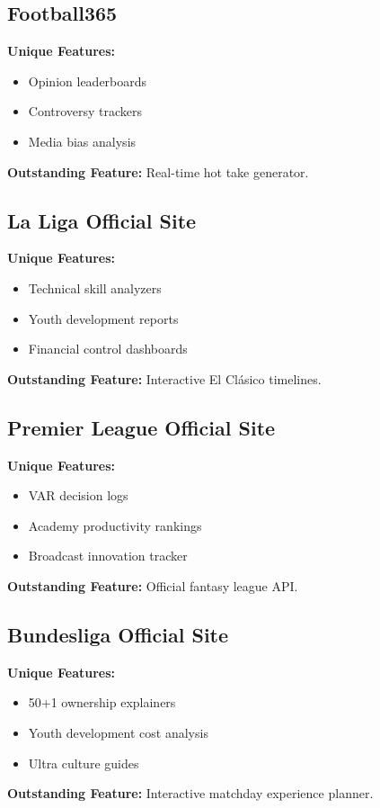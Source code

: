 \documentclass{report}
\begin{document}
\subsection{Football365}
\textbf{Unique Features:}
\begin{itemize}
    \item Opinion leaderboards
    \item Controversy trackers
    \item Media bias analysis
\end{itemize}
\textbf{Outstanding Feature:} Real-time hot take generator\citep{f365}.

\subsection{La Liga Official Site}
\textbf{Unique Features:}
\begin{itemize}
    \item Technical skill analyzers
    \item Youth development reports
    \item Financial control dashboards
\end{itemize}
\textbf{Outstanding Feature:} Interactive El Clásico timelines\citep{laliga}.

\subsection{Premier League Official Site}
\textbf{Unique Features:}
\begin{itemize}
    \item VAR decision logs
    \item Academy productivity rankings
    \item Broadcast innovation tracker
\end{itemize}
\textbf{Outstanding Feature:} Official fantasy league API\citep{premier}.

\subsection{Bundesliga Official Site}
\textbf{Unique Features:}
\begin{itemize}
    \item 50+1 ownership explainers
    \item Youth development cost analysis
    \item Ultra culture guides
\end{itemize}
\textbf{Outstanding Feature:} Interactive matchday experience planner\citep{bundesliga}.
\end{document}
